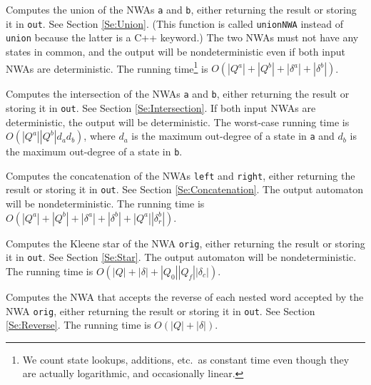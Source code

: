 \begin{functionlist}

    Computes the union of the NWAs \texttt{a} and \texttt{b},
    either returning the result or storing it in \texttt{out}.
    See Section
    \ref{Se:Union}. (This function is called \texttt{unionNWA} instead of
    \texttt{union} because the latter is a C++ keyword.) The two NWAs must not
    have any states in common, and the output will be nondeterministic even
    if both input NWAs are deterministic. The running time\footnote{We count
      state lookups, additions, etc.\ as constant time even though they are
      actually logarithmic, and occasionally linear.} is
    $O(|Q^a|+|Q^b|+|\delta^a|+|\delta^b|)$.

    Computes the intersection of the NWAs \texttt{a} and \texttt{b},
    either returning the result or storing it in \texttt{out}.
    See Section \ref{Se:Intersection}. If both input NWAs are deterministic,
    the output will be deterministic. The worst-case running time is
    $O(|Q^a| |Q^b| d_a d_b)$, where $d_a$ is the maximum out-degree
    of a state in \texttt{a} and $d_b$ is the maximum out-degree of a state
    in \texttt{b}.

    Computes the concatenation of the NWAs \texttt{left} and
    \texttt{right}, either returning the result or storing it in
    \texttt{out}.
    See Section \ref{Se:Concatenation}. The output automaton will be
    nondeterministic. The running time is
    $O(|Q^a|+|Q^b|+|\delta^a|+|\delta^b|+|Q^a||\delta_r^b|)$.

    Computes the Kleene star of the NWA \texttt{orig}, either
    returning the result or storing it in \texttt{out}. See Section
    \ref{Se:Star}. The output automaton will be nondeterministic. The
    running time is $O(|Q|+|\delta|+|Q_0||Q_f||\delta_c|)$.

    Computes the NWA that accepts the reverse of each nested word
    accepted by the NWA \texttt{orig}, either returning the result or
    storing it in \texttt{out}. See Section \ref{Se:Reverse}. The running
    time is $O(|Q|+|\delta|)$.


\end{functionlist}

